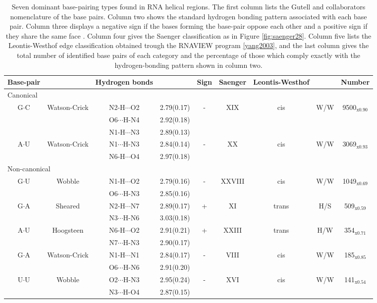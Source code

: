 \begin{table}
\begin{center}
\begin{tabular}{|c c|c c|c|c|c c|c|}
\hline
Base-pair & & Hydrogen bonds &  & Sign & Saenger & Leontis-Westhof & &
Number \\
\hline
\hline
\multicolumn{9}{|l|}{Canonical} \\
\hline
G$\cdot$C & Watson-Crick & N2-H$\cdots$O2 & 2.79(0.17) & - & XIX & cis
 & W/W & 9500$_{\text{x0.90}}$ \\
 & & O6$\cdots$H-N4 & 2.92(0.18) & & & & &  \\
 & & N1-H$\cdots$N3 & 2.89(0.13) & & & & &  \\
\hline
A$\cdot$U & Watson-Crick & N1$\cdots$H-N3 & 2.84(0.14) & - & XX & cis
& W/W & 3069$_{\text{x0.93}}$ \\
 & & N6-H$\cdots$O4 & 2.97(0.18) & & & & &  \\
\hline
\multicolumn{9}{|l|}{Non-canonical} \\
\hline
G$\cdot$U & Wobble & N1-H$\cdots$O2 & 2.79(0.16) & - & XXVIII & cis
 & W/W & 1049$_{\text{x0.69}}$ \\
 & & O6$\cdots$H-N3 & 2.85(0.16) & & & & &  \\
\hline
G$\cdot$A & Sheared & N2-H$\cdots$N7 & 2.89(0.17) & + & XI & trans
 & H/S & 509$_{\text{x0.59}}$ \\
 & & N3$\cdots$H-N6 & 3.03(0.18) & & & & &  \\
\hline
A$\cdot$U & Hoogsteen & N6-H$\cdots$O2 & 2.91(0.21) & + & XXIII & trans
 & H/W & 354$_{\text{x0.71}}$ \\
 & & N7$\cdots$H-N3 & 2.90(0.17) & & & & &  \\
\hline
G$\cdot$A & Watson-Crick & N1-H$\cdots$N1 & 2.84(0.17) & - & VIII & cis
 & W/W & 185$_{\text{x0.85}}$ \\
 & & O6$\cdots$H-N6 & 2.91(0.20) & & & & &  \\
\hline
U$\cdot$U & Wobble & O2$\cdots$H-N3 & 2.95(0.24) & - & XVI & cis
 & W/W & 141$_{\text{x0.54}}$ \\
 & & N3$\cdots$H-O4 & 2.87(0.15) & & & & &  \\
\hline
\end{tabular}
\caption{Seven  dominant  base-pairing  types  found  in  RNA  helical
  regions.   The  first  column  lists the  Gutell  and  collaborators
  nomenclature \cite{lee2004} of the  base pairs. Column two shows the
  standard hydrogen  bonding pattern  associated with each  base pair.
  Column  three displays  a negative  sign  if the  bases forming  the
  base-pair oppose  each other and a  positive sign if  they share the
  same   face   \cite{lu2003}.    Column   four  gives   the   Saenger
  classification as in  Figure \ref{fig:saenger28}.  Column five lists
  the Leontis-Westhof edge  classification obtained trough the RNAVIEW
  program \ref{yang2003},  and the last column gives  the total number
  of  identified base  pairs of  each category  and the  percentage of
  those which  comply exactly with the  hydrogen-bonding pattern shown
  in column two.}
\label{tab:seven}
\end{center}  
\end{table}  


